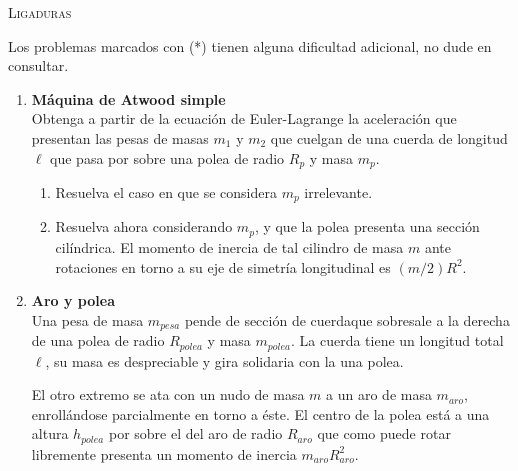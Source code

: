 \documentclass[11pt, spanish, a4paper, twoside]{article}
\begin{document}
\begin{center}
  \textsc{\large Ligaduras}
\end{center}

\noindent
Los problemas marcados con (*) tienen alguna dificultad adicional, no dude en consultar.
\begin{enumerate}


\item 
	\begin{minipage}[t][2cm]{0.7\textwidth}
		\textbf{Máquina de Atwood simple}\\
		Obtenga a partir de la ecuación de Euler-Lagrange la aceleración que presentan las pesas de masas \(m_1\) y \(m_2\) que cuelgan de una cuerda de longitud \(\ell\) que pasa por sobre una polea de radio \(R_p\) y masa \(m_p\).
	\end{minipage}
	\begin{minipage}[c][2cm][t]{0.2\textwidth}
		
	\end{minipage}
	\begin{enumerate}
		\item Resuelva el caso en que se considera \(m_p\) irrelevante.
		\item Resuelva ahora considerando \(m_p\), y que la polea presenta una sección cilíndrica.
			El momento de inercia de tal cilindro de masa \(m\) ante rotaciones en torno a su eje de simetría longitudinal es \((m/2) R^2\).
	\end{enumerate}


\item 
	\begin{minipage}[t][6cm]{0.55\textwidth}
		\textbf{Aro y polea}\\
		Una pesa de masa \(m_{pesa}\) pende de sección de cuerdaque sobresale a la derecha de una polea de radio \(R_{polea}\) y masa \(m_{polea}\).
		La cuerda tiene un longitud total \(\ell\), su  masa es despreciable y gira solidaria con la una polea.

		El otro extremo se ata con un nudo de masa \(m\) a un aro de masa \(m_{aro}\), enrollándose parcialmente en torno a éste.
		El centro de la polea está a una altura \(h_{polea}\) por sobre el del aro de radio \(R_{aro}\) que como puede rotar libremente presenta un momento de inercia \(m_{aro} R_{aro}^2\).
		

\end{minipage}
\end{enumerate}
\end{document}
